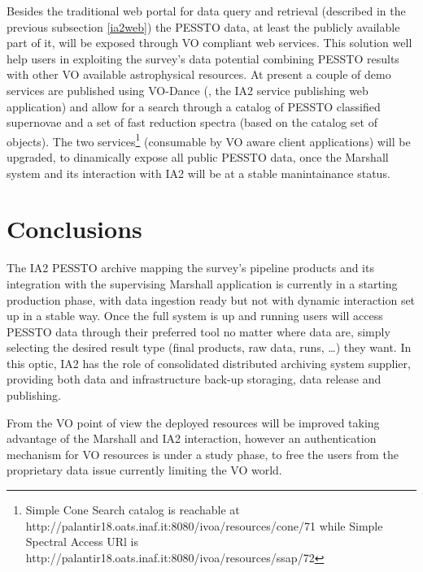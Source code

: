 Besides the traditional web portal for data query and retrieval (described in the previous subsection \ref{ia2web}) the PESSTO data, at least the publicly available part of it, will be exposed through VO compliant web services. This solution well help users in exploiting the survey's data potential combining PESSTO results with other VO available astrophysical resources.
At present a couple of demo services are published using VO-Dance (\cite{molinaro_spie12}, the IA2 service publishing web application) and allow for a search through a catalog of PESSTO classified supernovae and a set of fast reduction spectra (based on the catalog set of objects). The two services\footnote{Simple Cone Search catalog is reachable at http://palantir18.oats.inaf.it:8080/ivoa/resources/cone/71 while Simple Spectral Access URl is http://palantir18.oats.inaf.it:8080/ivoa/resources/ssap/72} (consumable by VO aware client applications) will be upgraded, to dinamically expose all public PESSTO data, once the Marshall system and its interaction with IA2 will be at a stable manintainance status.

\section{Conclusions}

The IA2 PESSTO archive mapping the survey's pipeline products and its integration with the supervising Marshall application is currently in a starting production phase, with data ingestion ready but not with dynamic interaction set up in a stable way. Once the full system is up and running users will access PESSTO data through their preferred tool no matter where data are, simply selecting the desired result type (final products, raw data, runs, \dots) they want.
In this optic, IA2 has the role of consolidated distributed archiving system supplier, providing both data and infrastructure back-up storaging, data release and publishing.

From the VO point of view the deployed resources will be improved taking advantage of the Marshall and IA2 interaction, however an authentication mechanism for VO resources is under a study phase, to free the users from the proprietary data issue currently limiting the VO world.



